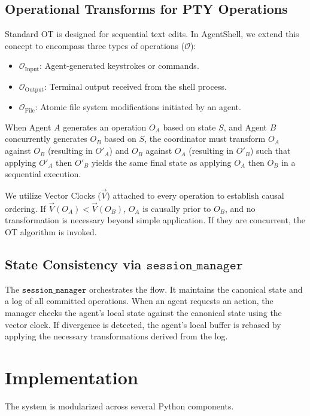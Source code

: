 \documentclass[11pt,a4paper]{article}
\begin{document}
\subsection{Operational Transforms for PTY Operations}
Standard OT is designed for sequential text edits. In AgentShell, we extend this concept to encompass three types of operations ($\mathcal{O}$):
\begin{itemize}
    \item $\mathcal{O}_{\text{Input}}$: Agent-generated keystrokes or commands.
    \item $\mathcal{O}_{\text{Output}}$: Terminal output received from the shell process.
    \item $\mathcal{O}_{\text{File}}$: Atomic file system modifications initiated by an agent.
\end{itemize}

When Agent $A$ generates an operation $O_A$ based on state $S$, and Agent $B$ concurrently generates $O_B$ based on $S$, the coordinator must transform $O_A$ against $O_B$ (resulting in $O'_A$) and $O_B$ against $O_A$ (resulting in $O'_B$) such that applying $O'_A$ then $O'_B$ yields the same final state as applying $O_A$ then $O_B$ in a sequential execution.

We utilize Vector Clocks ($\vec{V}$) attached to every operation to establish causal ordering. If $\vec{V}(O_A) < \vec{V}(O_B)$, $O_A$ is causally prior to $O_B$, and no transformation is necessary beyond simple application. If they are concurrent, the OT algorithm is invoked.

\subsection{State Consistency via $\texttt{session\_manager}$}
The $\texttt{session\_manager}$ orchestrates the flow. It maintains the canonical state and a log of all committed operations. When an agent requests an action, the manager checks the agent's local state against the canonical state using the vector clock. If divergence is detected, the agent's local buffer is rebased by applying the necessary transformations derived from the log.

\section{Implementation}
The system is modularized across several Python components.
\end{document}
